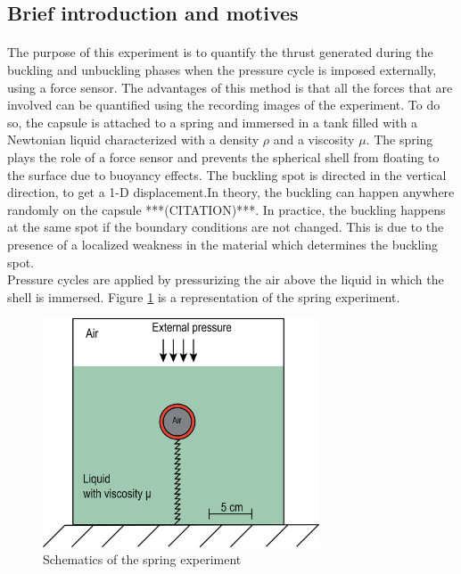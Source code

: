 \subsection{Brief introduction and motives}

\paragraph{}
The purpose of this experiment is to quantify the thrust generated during the buckling and unbuckling phases when the pressure cycle is imposed externally, using a force sensor. The advantages of this method is that all the forces that are involved can be quantified using the recording images of the experiment. To do so, the capsule is attached to a spring and immersed in a tank filled with a Newtonian liquid characterized with a density $\rho$ and a viscosity $\mu$. The spring plays the role of a force sensor and prevents the spherical shell from floating to the surface due to buoyancy effects.  The buckling spot is directed in the vertical direction, to get a 1-D displacement.In theory, the buckling can happen anywhere randomly on the capsule ***(CITATION)***. In practice, the buckling happens at the same spot if the boundary conditions are not changed. This is due to the presence of a localized weakness in the material which determines the buckling spot.\\
Pressure cycles are applied by pressurizing the air above the liquid in which the shell is immersed. Figure \ref{fig:spring_experiment_schematic} is a representation of the spring experiment.
\begin{figure}[H] %
	\centering%
  \includegraphics[width=0.73\textwidth]{figures/Chapter_1/schematic_experimental_setup.png}
	\caption{Schematics of the spring experiment}
	\label{fig:spring_experiment_schematic}
\end{figure}

